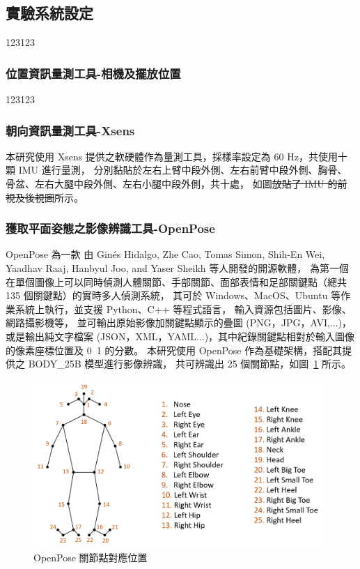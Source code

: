 \subsection{實驗系統設定}
123123

\subsubsection{位置資訊量測工具-相機及擺放位置}
123123

\subsubsection{朝向資訊量測工具-Xsens}
本研究使用 Xsens 提供之軟硬體作為量測工具，採樣率設定為 60 Hz，共使用十顆 IMU 進行量測，
分別黏貼於左右上臂中段外側、左右前臂中段外側、胸骨、骨盆、左右大腿中段外側、左右小腿中段外側，共十處，
如圖\sout{放貼了 IMU 的前視及後視圖}所示。

\subsubsection{獲取平面姿態之影像辨識工具-OpenPose}
OpenPose 為一款
由  Ginés Hidalgo, Zhe Cao, Tomas Simon, Shih-En Wei, Yaadhav Raaj, Hanbyul Joo, and Yaser Sheikh 等人開發的開源軟體，
為第一個在單個圖像上可以同時偵測人體關節、手部關節、面部表情和足部關鍵點（總共 135 個關鍵點）的實時多人偵測系統，
其可於 Windows、MacOS、Ubuntu 等作業系統上執行，並支援 Python、C++ 等程式語言，
輸入資源包括圖片、影像、網路攝影機等，
並可輸出原始影像加關鍵點顯示的疊圖 (PNG，JPG，AVI,...)，
或是輸出純文字檔案 (JSON，XML，YAML...)，其中紀錄關鍵點相對於輸入圖像的像素座標位置及 0~1 的分數。
本研究使用 OpenPose 作為基礎架構，搭配其提供之 BODY\_25B 模型進行影像辨識，
共可辨識出 25 個關節點，如圖~\ref{ch3_fig_OpenPose} 所示。

\begin{figure}[!ht]
   \centering
   \includegraphics[width=11cm]{figure/ch3_fig_OpenPose.png}
    \caption[OpenPose 關節點對應位置]{OpenPose 關節點對應位置}
    \label{ch3_fig_OpenPose}
\end{figure}

